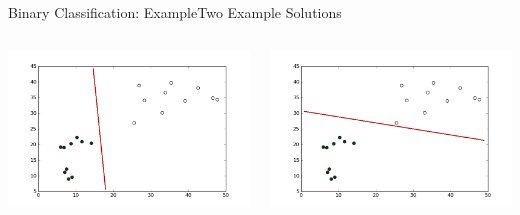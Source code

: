 \documentclass[xcolor=dvipsnames]{beamer}
\begin{document}
\begin{frame}{Binary Classification: Example}{Two Example Solutions}
    \begin{columns}
        \begin{column}{0.5\textwidth}
            \begin{center}
                \includegraphics[width=\textwidth]{figs/binclass_2.png}
            \end{center}
        \end{column}
        \begin{column}{0.5\textwidth}
            \begin{center}
                \includegraphics[width=\textwidth]{figs/binclass_3.png}
            \end{center}
        \end{column}
    \end{columns}
\end{frame}
\end{document}
